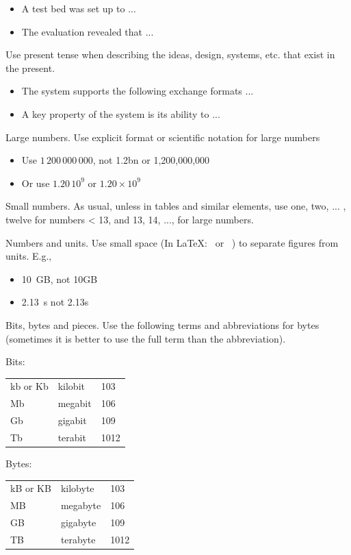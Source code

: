 \begin{itemize}
    \item A test bed was set up to ...
    \item The evaluation revealed that ...
\end{itemize}

Use present tense when describing the ideas, design, systems, etc. that exist in the present. 

\begin{itemize}
    \item The system supports the following exchange formats ...
    \item A key property of the system is its ability to ...
\end{itemize}

Large numbers. Use explicit format or scientific notation for large numbers

\begin{itemize}
    \item Use $1\,200\,000\,000$, not 1.2bn or 1,200,000,000
    \item Or use $1.20\,10^9$ or $1.20 \times 10^9$
\end{itemize}

Small numbers. As usual, unless in tables and similar elements, use {one, two, ... , twelve} for numbers < 13, and {13, 14, ..., } for large numbers.

Numbers and units. Use small space (In \LaTeX: \, or ~) to separate figures from units. E.g.,

\begin{itemize}
    \item 10~GB, not 10GB
    \item 2.13~s not 2.13s
\end{itemize}

Bits, bytes and pieces. Use the following terms and abbreviations for bytes (sometimes it is better to use the full term than the abbreviation).

Bits:\\
\begin{tabular}{lll}
    kb or Kb&	kilobit&	103\\ 
    Mb&	megabit&	106\\ 
    Gb&	gigabit&	109\\ 
    Tb&	terabit&	1012\\ 
\end{tabular}

Bytes:\\
\begin{tabular}{lll}
    kB or KB&	kilobyte&	103\\ 
    MB&	megabyte&106\\ 
    GB	&gigabyte	&109\\ 
    TB	&terabyte	&1012\\ 
\end{tabular}

